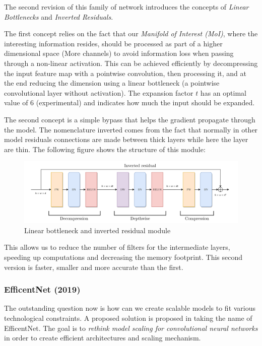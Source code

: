 \documentclass{article}
\begin{document}
        The second revision of this family of network introduces the concepts of \emph{Linear Bottlenecks} and \emph{Inverted Residuals}.

        The first concept relies on the fact that our \emph{Manifold of Interest (MoI)}, where the interesting information resides, should be processed as part of a higher dimensional space (More channels) to avoid information loss when passing through a non-linear activation. This can be achieved
        efficiently by decompressing the input feature map with a pointwise convolution, then processing it, and at the end reducing the dimension using a linear bottleneck (a pointwise convolutional layer without activation). The expansion factor $t$ has an optimal value of 6 (experimental) and indicates
        how much the input should be expanded.

        The second concept is a simple bypass that helps the gradient propagate through the model. The nomenclature inverted comes from the fact that normally in other model residuals connections are made between thick layers while here the layer are thin.
        The following figure shows the structure of this module:
        \begin{figure}[H]
          \includegraphics[scale=0.6]{../Images/MnetV2.png}
          \centering
          \caption{Linear bottleneck and inverted residual module}
        \end{figure}

        This allows us to reduce the number of filters for the intermediate layers, speeding up computations and decreasing the memory footprint. This second version is faster, smaller and more accurate than the first.
      \subsubsection{EfficentNet (2019)}
        The outstanding question now is how can we create scalable models to fit various technological constraints. A proposed solution is proposed in \cite{ENet} taking the name of EfficentNet. The goal is to 
        \emph{rethink model scaling for convolutional neural networks} in order to create efficient architectures and scaling mechanism.
\end{document}
